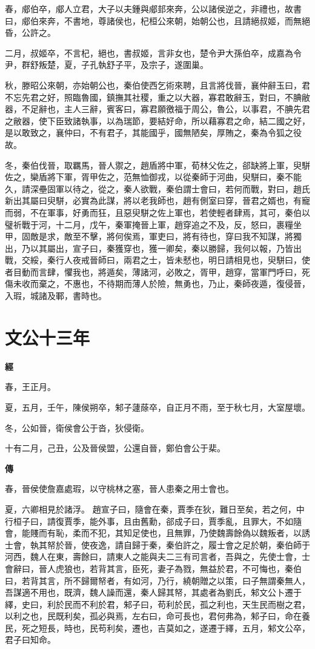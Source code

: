 \documentclass{ctexart}
\begin{document}
春，郕伯卒，郕人立君，大子以夫鍾與郕邽來奔，公以諸侯逆之，非禮也，故書曰，郕伯來奔，不書地，尊諸侯也，杞桓公來朝，始朝公也，且請絕叔姬，而無絕昏，公許之。

二月，叔姬卒，不言杞，絕也，書叔姬，言非女也，楚令尹大孫伯卒，成嘉為令尹，群舒叛楚，夏，子孔執舒子平，及宗子，遂圍巢。

秋，滕昭公來朝，亦始朝公也，秦伯使西乞術來聘，且言將伐晉，襄仲辭玉曰，君不忘先君之好，照臨魯國，鎮撫其社稷，重之以大器，寡君敢辭玉，對曰，不腆敝器，不足辭也，主人三辭，賓客曰，寡君願徼福于周公，魯公，以事君，不腆先君之敝器，使下臣致諸執事，以為瑞節，要結好命，所以藉寡君之命，結二國之好，是以敢致之，襄仲曰，不有君子，其能國乎，國無陋矣，厚賄之，秦為令狐之役故。

冬，秦伯伐晉，取羈馬，晉人禦之，趙盾將中軍，荀林父佐之，郤缺將上軍，臾駢佐之，欒盾將下軍，胥甲佐之，范無恤御戎，以從秦師于河曲，臾駢曰，秦不能久，請深壘固軍以待之，從之，秦人欲戰，秦伯謂士會曰，若何而戰，對曰，趙氏新出其屬曰臾駢，必實為此謀，將以老我師也，趙有側室曰穿，晉君之婿也，有寵而弱，不在軍事，好勇而狂，且惡臾駢之佐上軍也，若使輕者肆焉，其可，秦伯以璧祈戰于河，十二月，戊午，秦軍掩晉上軍，趙穿追之不及，反，怒曰，裹糧坐甲，固敵是求，敵至不擊，將何俟焉，軍吏曰，將有待也，穿曰我不知謀，將獨出，乃以其屬出，宣子曰，秦獲穿也，獲一卿矣，秦以勝歸，我何以報，乃皆出戰，交綏，秦行人夜戒晉師曰，兩君之士，皆未憖也，明日請相見也，臾駢曰，使者目動而言肆，懼我也，將遁矣，薄諸河，必敗之，胥甲，趙穿，當軍門呼曰，死傷未收而棄之，不惠也，不待期而薄人於險，無勇也，乃止，秦師夜遁，復侵晉，入瑕，城諸及鄆，書時也。





\section{文公十三年}


\textbf{經}



春，王正月。

夏，五月，壬午，陳侯朔卒，邾子蘧蒢卒，自正月不雨，至于秋七月，大室屋壞。

冬，公如晉，衛侯會公于沓，狄侵衛。

十有二月，己丑，公及晉侯盟，公還自晉，鄭伯會公于棐。

\textbf{傳}



春，晉侯使詹嘉處瑕，以守桃林之塞，晉人患秦之用士會也。

夏，六卿相見於諸浮。
趙宣子曰，隨會在秦，賈季在狄，難日至矣，若之何，中行桓子曰，請復賈季，能外事，且由舊勳，郤成子曰，賈季亂，且罪大，不如隨會，能賤而有恥，柔而不犯，其知足使也，且無罪，乃使魏壽餘偽以魏叛者，以誘士會，執其帑於晉，使夜逸，請自歸于秦，秦伯許之，履士會之足於朝，秦伯師于河西，魏人在東，壽餘曰，請東人之能與夫二三有司言者，吾與之，先使士會，士會辭曰，晉人虎狼也，若背其言，臣死，妻子為戮，無益於君，不可悔也，秦伯曰，若背其言，所不歸爾帑者，有如河，乃行，繞朝贈之以策，曰子無謂秦無人，吾謀適不用也，既濟，魏人譟而還，秦人歸其帑，其處者為劉氏，邾文公卜遷于繹，史曰，利於民而不利於君，邾子曰，苟利於民，孤之利也，天生民而樹之君，以利之也，民既利矣，孤必與焉，左右曰，命可長也，君何弗為，邾子曰，命在養民，死之短長，時也，民苟利矣，遷也，吉莫如之，遂遷于繹，五月，邾文公卒，君子曰知命。
\end{document}
